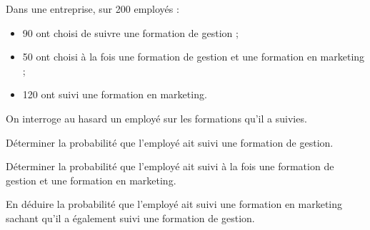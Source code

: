 \documentclass[11pt]{article}
\begin{document}
\begin{exercice}
Dans une entreprise, sur 200 employés :
\begin{itemize}
    \item 90 ont choisi de suivre une formation de gestion ;
    \item 50 ont choisi à la fois une formation de gestion et une formation en marketing ;
    \item 120 ont suivi une formation en marketing.
\end{itemize}

On interroge au hasard un employé sur les formations qu'il a suivies.

\begin{enu}
\item Déterminer la probabilité que l'employé ait suivi une formation de gestion.
\item Déterminer la probabilité que l'employé ait suivi à la fois une formation de gestion et une formation en marketing.
\item En déduire la probabilité que l'employé ait suivi une formation en marketing sachant qu'il a également suivi une formation de gestion.
\end{enu}
\end{exercice}
\end{document}
